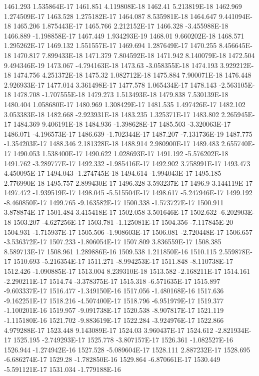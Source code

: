 1461.293  1.535864E-17
1461.851  4.119808E-18
1462.41  5.213819E-18
1462.969  1.274509E-17
1463.528  1.275182E-17
1464.087  8.535981E-18
1464.647  9.441094E-18
1465.206  1.875443E-17
1465.766  2.212152E-17
1466.328  -3.455988E-18
1466.889  -1.198858E-17
1467.449  1.934293E-19
1468.01  9.660202E-18
1468.571  1.295262E-17
1469.132  1.551557E-17
1469.694  1.287649E-17
1470.255  8.456645E-18
1470.817  7.899433E-18
1471.379  7.804592E-18
1471.942  8.140079E-18
1472.504  9.494346E-19
1473.067  -4.794163E-18
1473.63  -3.058355E-18
1474.193  3.929212E-18
1474.756  4.251372E-18
1475.32  1.082712E-18
1475.884  7.900071E-18
1476.448  2.926933E-17
1477.014  3.361498E-17
1477.578  1.065434E-17
1478.143  -2.563105E-18
1478.708  -1.707555E-18
1479.273  1.513493E-18
1479.838  7.530139E-18
1480.404  1.058680E-17
1480.969  1.308429E-17
1481.535  1.497426E-17
1482.102  3.053383E-18
1482.668  -2.923931E-18
1483.235  1.325371E-17
1483.802  2.265945E-17
1484.369  9.406191E-18
1484.936  -1.398628E-17
1485.503  -3.320063E-17
1486.071  -4.196573E-17
1486.639  -1.702344E-17
1487.207  -7.131736E-19
1487.775  -1.354203E-17
1488.346  2.181328E-18
1488.914  2.980900E-17
1489.483  2.655740E-17
1490.053  1.538400E-17
1490.622  1.028693E-17
1491.192  -5.576202E-18
1491.762  -3.289777E-17
1492.332  -1.985416E-17
1492.902  3.758991E-17
1493.473  4.450095E-17
1494.043  -1.274745E-18
1494.614  -1.994043E-17
1495.185  2.776990E-18
1495.757  2.899430E-17
1496.328  3.593237E-17
1496.9  3.144119E-17
1497.472  -1.939519E-17
1498.045  -5.515504E-17
1498.617  -5.247946E-17
1499.192  -8.460850E-17
1499.765  -9.163582E-17
1500.338  -1.573727E-17
1500.911  3.878874E-17
1501.484  3.415418E-17
1502.058  3.501646E-17
1502.632  -6.202903E-18
1503.207  -4.627256E-17
1503.781  -1.125081E-17
1504.356  -7.117845E-20
1504.931  -1.715937E-17
1505.506  -1.908603E-17
1506.081  -2.720448E-17
1506.657  -3.536372E-17
1507.233  -1.806054E-17
1507.809  3.836559E-17
1508.385  8.589713E-17
1508.961  1.289886E-16
1509.538  1.211850E-16
1510.115  2.559878E-17
1510.693  -5.216354E-17
1511.271  -8.994253E-17
1511.848  -8.110738E-17
1512.426  -1.090885E-17
1513.004  8.239310E-18
1513.582  -2.168211E-17
1514.161  -2.290211E-17
1514.74  -3.378375E-17
1515.318  -6.571635E-17
1515.897  -9.603337E-17
1516.477  -1.349150E-16
1517.056  -1.480168E-16
1517.636  -9.162251E-17
1518.216  -4.507400E-17
1518.796  -6.951979E-17
1519.377  -1.100201E-16
1519.957  -9.091738E-17
1520.538  -8.907817E-17
1521.119  -1.115180E-16
1521.702  -9.883619E-17
1522.284  -3.924976E-17
1522.866  4.979288E-17
1523.448  9.143089E-17
1524.03  3.960437E-17
1524.612  -2.821934E-17
1525.195  -2.749293E-17
1525.778  -3.807157E-17
1526.361  -1.082527E-16
1526.944  -1.274942E-16
1527.528  -5.089604E-17
1528.111  2.887232E-17
1528.695  -6.686274E-17
1529.28  -1.782850E-16
1529.864  -6.870661E-17
1530.449  -5.591121E-17
1531.034  -1.779188E-16
